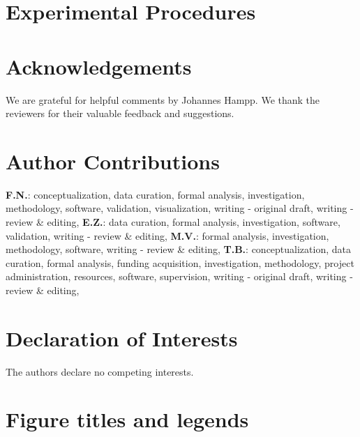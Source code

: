 \documentclass[3p]{elsarticle}
\begin{document}


\section*{Experimental Procedures}
\label{sec:methods}



\section*{Acknowledgements}

We are grateful for helpful comments by Johannes Hampp. We thank the
reviewers for their valuable feedback and suggestions.


\section*{Author Contributions}


\textbf{F.N.}:
conceptualization,
data curation,
formal analysis,
investigation,
methodology,
software,
validation,
visualization,
writing - original draft,
writing - review \& editing,
\textbf{E.Z.}:
data curation,
formal analysis,
investigation,
software,
validation,
writing - review \& editing,
\textbf{M.V.}:
formal analysis,
investigation,
methodology,
software,
writing - review \& editing,
\textbf{T.B.}:
conceptualization,
data curation,
formal analysis,
funding acquisition,
investigation,
methodology,
project administration,
resources,
software,
supervision,
writing - original draft,
writing - review \& editing,

\section*{Declaration of Interests}

The authors declare no competing interests.


% 


\section*{Figure titles and legends}


\end{document}
